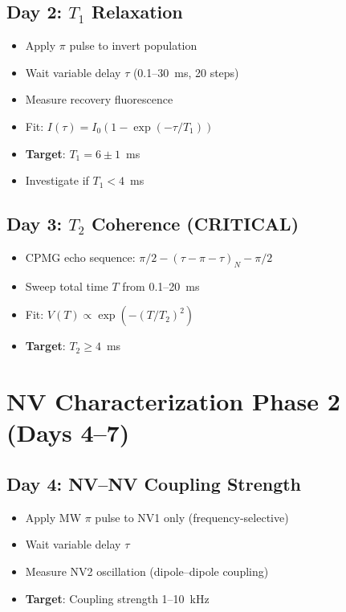 \documentclass[11pt,a4paper,openany]{book}
\begin{document}
\subsection{Day 2: $T_1$ Relaxation}

\begin{itemize}[nosep]
  \item Apply $\pi$ pulse to invert population
  \item Wait variable delay $\tau$ (0.1--30~ms, 20 steps)
  \item Measure recovery fluorescence
  \item Fit: $I(\tau) = I_0(1 - \exp(-\tau/T_1))$
  \item \textbf{Target}: $T_1 = 6 \pm 1$~ms
  \item Investigate if $T_1 < 4$~ms
\end{itemize}

\subsection{Day 3: $T_2$ Coherence (CRITICAL)}

\begin{itemize}[nosep]
  \item CPMG echo sequence: $\pi/2 - (\tau - \pi - \tau)_N - \pi/2$
  \item Sweep total time $T$ from 0.1--20~ms
  \item Fit: $V(T) \propto \exp(-(T/T_2)^2)$
  \item \textbf{Target}: $T_2 \geq 4$~ms
\end{itemize}


\section{NV Characterization Phase 2 (Days 4--7)}

\subsection{Day 4: NV--NV Coupling Strength}

\begin{itemize}[nosep]
  \item Apply MW $\pi$ pulse to NV1 only (frequency-selective)
  \item Wait variable delay $\tau$
  \item Measure NV2 oscillation (dipole--dipole coupling)
  \item \textbf{Target}: Coupling strength 1--10~kHz
\end{itemize}
\end{document}
